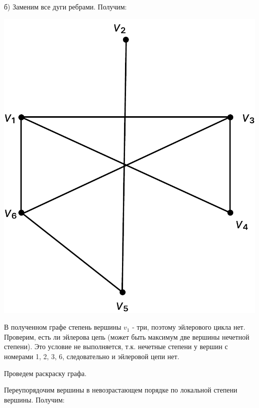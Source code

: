 \documentclass[12pt]{article}
\begin{document}
б) Заменим все дуги ребрами. Получим:

\begin{center}
	\includegraphics[scale=.8]{20_2.pdf}
\end{center}

В полученном графе степень вершины $v_1$ - три, поэтому
эйлерового цикла нет. Проверим, есть ли эйлерова цепь (может быть
максимум две вершины нечетной степени). Это условие не
выполняется, т.к. нечетные степени у вершин с номерами 1, 2, 3, 6,
следовательно и эйлеровой цепи нет.

Проведем раскраску графа.

Переупорядочим вершины в невозрастающем порядке по
локальной степени вершины. Получим:
\end{document}
